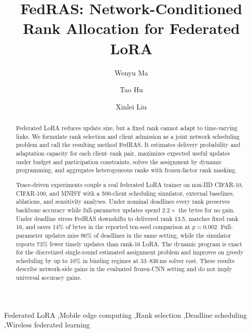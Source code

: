 \documentclass[preprint,12pt]{elsarticle}
\begin{document}
\begin{frontmatter}
\title{FedRAS: Network-Conditioned Rank Allocation for Federated LoRA}
\author[inst1,inst2,inst3]{Wenyu Ma}
\author[inst1,inst2,inst3]{Tao Hu}
\author[inst1,inst2,inst3]{Xinlei Liu}
\address[inst1]{Information Engineering University, Zhengzhou 450001, China}
\address[inst2]{Key Laboratory of Cyberspace Endogenous Safety and Security of Henan Province, Zhengzhou 450001, China}
\address[inst3]{Key Laboratory of Cyberspace Security, Ministry of Education of China, Zhengzhou 450001, China}

\begin{abstract}
Federated LoRA reduces update size, but a fixed rank cannot adapt to time-varying links. We formulate rank selection and client admission as a joint network scheduling problem and call the resulting method FedRAS. It estimates delivery probability and adaptation capacity for each client--rank pair, maximizes expected useful updates under budget and participation constraints, solves the assignment by dynamic programming, and aggregates heterogeneous ranks with frozen-factor rank masking.

Trace-driven experiments couple a real federated LoRA trainer on non-IID CIFAR-10, CIFAR-100, and MNIST with a 500-client scheduling simulator, external baselines, ablations, and sensitivity analyses. Under nominal deadlines every rank preserves backbone accuracy while full-parameter updates spend $2.2\times$ the bytes for no gain. Under deadline stress FedRAS downshifts to delivered rank 13.5, matches fixed rank 16, and saves 14\% of bytes in the reported ten-seed comparison at $p{=}0.002$. Full-parameter updates miss 96\% of deadlines in the same setting, while the simulator reports 73\% fewer timely updates than rank-16 LoRA. The dynamic program is exact for the discretized single-round estimated assignment problem and improves on greedy scheduling by up to 10\% in binding regimes at 33--836\,ms solver cost. These results describe network-side gains in the evaluated frozen-CNN setting and do not imply universal accuracy gains.
\end{abstract}

\begin{keyword}
Federated LoRA \sep Mobile edge computing \sep Rank selection \sep Deadline scheduling \sep Wireless federated learning
\end{keyword}
\end{frontmatter}
\end{document}
